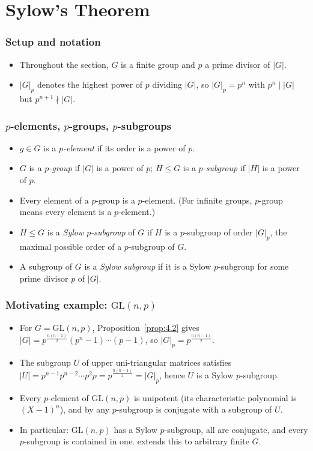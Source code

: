 \documentclass[../Odyssey_Project.tex]{subfiles}
\begin{document}
\setcounter{section}{6}
\section{Sylow's Theorem}

\subsubsection*{Setup and notation}
\begin{itemize}
    \item Throughout the section, $G$ is a finite group and $p$ a prime divisor of $|G|$.
    \item $|G|_p$ denotes the highest power of $p$ dividing $|G|$, so $|G|_p = p^n$ with $p^n \mid |G|$ but $p^{n+1} \nmid |G|$.
\end{itemize}

\subsubsection*{$p$-elements, $p$-groups, $p$-subgroups}
\begin{itemize}
    \item $g \in G$ is a \emph{$p$-element} if its order is a power of $p$.
    \item $G$ is a \emph{$p$-group} if $|G|$ is a power of $p$; $H \leq G$ is a \emph{$p$-subgroup} if $|H|$ is a power of $p$.
    \item Every element of a $p$-group is a $p$-element. (For infinite groups, $p$-group means every element is a $p$-element.)
    \item $H \leq G$ is a \emph{Sylow $p$-subgroup} of $G$ if $H$ is a $p$-subgroup of order $|G|_p$, the maximal possible order of a $p$-subgroup of $G$.
    \item A subgroup of $G$ is a \emph{Sylow subgroup} if it is a Sylow $p$-subgroup for some prime divisor $p$ of $|G|$.
\end{itemize}

\subsubsection*{Motivating example: $\mathrm{GL}(n, p)$}
\begin{itemize}
    \item For $G = \mathrm{GL}(n, p)$, Proposition~\ref{prop:4.2} gives $|G| = p^{\frac{n(n-1)}{2}}(p^n - 1)\cdots(p - 1)$, so $|G|_p = p^{\frac{n(n-1)}{2}}$.
    \item The subgroup $U$ of upper uni-triangular matrices satisfies $|U| = p^{n-1}p^{n-2}\cdots p^2 p = p^{\frac{n(n-1)}{2}} = |G|_p$, hence $U$ is a Sylow $p$-subgroup.
    \item Every $p$-element of $\mathrm{GL}(n,p)$ is unipotent (its characteristic polynomial is $(X-1)^n$), and by  any $p$-subgroup is conjugate with a subgroup of $U$.
    \item In particular: $\mathrm{GL}(n,p)$ has a Sylow $p$-subgroup, all are conjugate, and every $p$-subgroup is contained in one.  extends this to arbitrary finite $G$.
\end{itemize}
\end{document}
